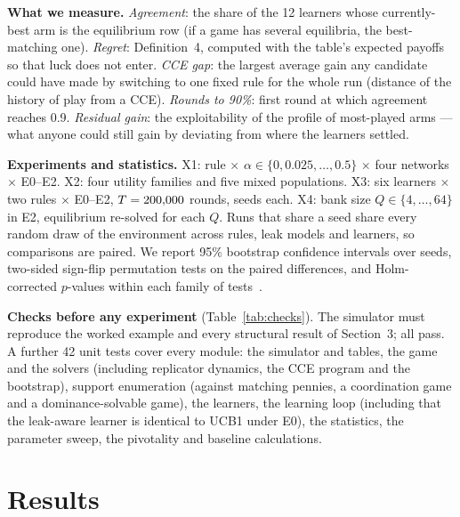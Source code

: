 \documentclass[10pt]{article}
\theoremstyle{plain}
\theoremstyle{definition}\newtheorem{definition}{Definition}
\begin{document}
\textbf{What we measure.}
\emph{Agreement}: the share of the 12 learners whose currently-best arm is the equilibrium row (if a game has several equilibria, the best-matching one).
\emph{Regret}: Definition~4, computed with the table's expected payoffs so that luck does not enter.
\emph{CCE gap}: the largest average gain any candidate could have made by switching to one fixed rule for the whole run (distance of the history of play from a CCE).
\emph{Rounds to 90\%}: first round at which agreement reaches 0.9.
\emph{Residual gain}: the exploitability of the profile of most-played arms --- what anyone could still gain by deviating from where the learners settled.

\textbf{Experiments and statistics.} X1: rule $\times$ $\alpha\in\{0,0.025,\dots,0.5\}$ $\times$ four networks $\times$ E0--E2. X2: four utility families and five mixed populations.
X3: six learners $\times$ two rules $\times$ E0--E2, $T=200{,}000$ rounds, \XthreeSeeds{} seeds each. X4: bank size $Q\in\{4,\dots,64\}$ in E2, equilibrium re-solved for each $Q$.
Runs that share a seed share every random draw of the environment across rules, leak models and learners, so comparisons are paired. We report 95\% bootstrap confidence intervals over seeds,
two-sided sign-flip permutation tests on the paired differences, and Holm-corrected $p$-values within each family of tests~\cite{holm}.

\textbf{Checks before any experiment} (Table~\ref{tab:checks}). The simulator must reproduce the worked example and every structural result of Section~3; all pass.
A further 42 unit tests cover every module: the simulator and tables, the game and the solvers (including replicator dynamics, the CCE program and the bootstrap), support enumeration (against matching pennies,
a coordination game and a dominance-solvable game), the learners, the learning loop (including that the leak-aware learner is identical to UCB1 under E0), the statistics, the parameter sweep, the pivotality and baseline calculations.

\begin{table}[t]\centering\small
\caption{Verification checks. ``Deviations'' are all rows of every type of every candidate, against both ``nobody shares'' and ``everybody shares''.}\label{tab:checks}
\resizebox{0.97\textwidth}{!}{}
\end{table}

\section{Results}\label{sec:results}
\end{document}
